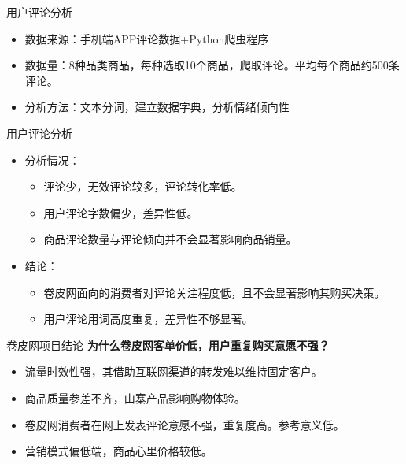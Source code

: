 \documentclass[10pt]{beamer}
\begin{document}
\begin{frame}{用户评论分析}
  \begin{itemize}
    \item 数据来源：手机端APP评论数据+Python爬虫程序\newline
    \item 数据量：8种品类商品，每种选取10个商品，爬取评论。平均每个商品约500条评论。\newline
    \item 分析方法：文本分词，建立数据字典，分析情绪倾向性\newline
  \end{itemize}
\end{frame}


\begin{frame}{用户评论分析}
\begin{itemize}
\item 分析情况：\newline
  \begin{itemize}
    \item 评论少，无效评论较多，评论转化率低。\newline
    \item 用户评论字数偏少，差异性低。\newline
    \item 商品评论数量与评论倾向并不会显著影响商品销量。\newline
  \end{itemize}
\item 结论：
  \begin{itemize}
    \item 卷皮网面向的消费者对评论关注程度低，且不会显著影响其购买决策。\newline
    \item 用户评论用词高度重复，差异性不够显著。\newline
  \end{itemize}
\end{itemize}
\end{frame}


\begin{frame}{卷皮网项目结论}
\textbf{为什么卷皮网客单价低，用户重复购买意愿不强？}\newline
  \begin{itemize}
    \item 流量时效性强，其借助互联网渠道的转发难以维持固定客户。\newline
    \item 商品质量参差不齐，山寨产品影响购物体验。\newline
    \item 卷皮网消费者在网上发表评论意愿不强，重复度高。参考意义低。\newline
    \item 营销模式偏低端，商品心里价格较低。
  \end{itemize}


\end{frame}
\end{document}
